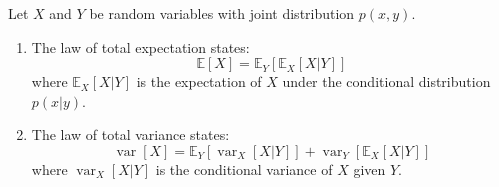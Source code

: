 \documentclass[../main.tex]{subfiles}
\begin{document}
\begin{yellow}
    
\begin{theorem}
Let $X$ and $Y$ be random variables with joint distribution $p(x,y)$.
\begin{enumerate}
    \item The law of total expectation states:
    \begin{equation*}
    \mathbb{E}[X] = \mathbb{E}_{Y}[\mathbb{E}_{X}[X|Y]]
    \end{equation*}
    where $\mathbb{E}_{X}[X|Y]$ is the expectation of $X$ under the conditional distribution $p(x|y)$.
    
    \item The law of total variance states:
    \begin{equation*}
    \operatorname{var}[X] = \mathbb{E}_{Y}[\operatorname{var}_{X}[X|Y]] + \operatorname{var}_{Y}[\mathbb{E}_{X}[X|Y]]
    \end{equation*}
    where $\operatorname{var}_{X}[X|Y]$ is the conditional variance of $X$ given $Y$.
\end{enumerate}
\end{theorem}

\end{yellow}
\end{document}
